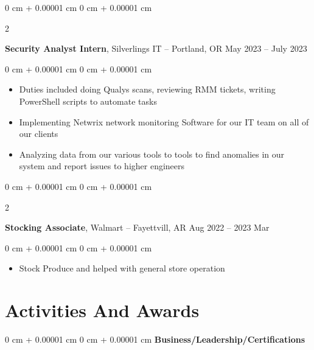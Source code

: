 \documentclass[10pt, letterpaper]{article}
\newenvironment{highlights}{
    \begin{itemize}[
        topsep=0.10 cm,
        parsep=0.10 cm,
        partopsep=0pt,
        itemsep=0pt,
        leftmargin=0 cm + 10pt
    ]
}{
    \end{itemize}
} %
\newenvironment{onecolentry}{
    \begin{adjustwidth}{
        0 cm + 0.00001 cm
    }{
        0 cm + 0.00001 cm
    }
}{
    \end{adjustwidth}
} %
\newenvironment{twocolentry}[2][]{
    \onecolentry
    \def\secondColumn{#2}
    \setcolumnwidth{\fill, 4.5 cm}
    \begin{paracol}{2}
}{
    \switchcolumn \raggedleft \secondColumn
    \end{paracol}
    \endonecolentry
} %
\begin{document}
        
        \begin{twocolentry}{
            May 2023 – July 2023
        }
            \textbf{Security Analyst Intern}, Silverlings IT -- Portland, OR\end{twocolentry}

        \vspace{0.10 cm}
        \begin{onecolentry}
            \begin{highlights}
                \item Duties included doing Qualys scans, reviewing RMM tickets, writing PowerShell scripts to automate tasks
                \item Implementing Netwrix network monitoring Software for our IT team on all of our clients
                \item Analyzing data from our various tools to tools to find anomalies in our system and report issues to higher engineers
            \end{highlights}
        \end{onecolentry}


        \vspace{0.2 cm}

        \begin{twocolentry}{
            Aug 2022 –  2023 Mar
        }
            \textbf{Stocking Associate}, Walmart -- Fayettvill, AR\end{twocolentry}

        \vspace{0.10 cm}
        \begin{onecolentry}
            \begin{highlights}
                \item Stock Produce and helped with general store operation
            \end{highlights}
        \end{onecolentry}



    
    \section{Activities And Awards}

        
        \begin{onecolentry}{
        }
            \textbf{Business/Leadership/Certifications}\end{onecolentry}
\end{document}
